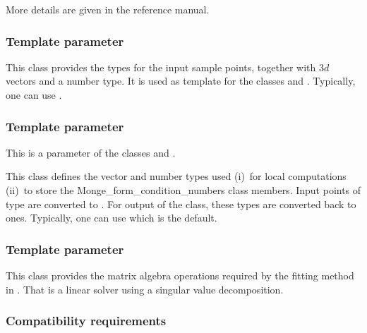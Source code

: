 More details are given in the reference manual.

\subsubsection{Template parameter }

This class provides the types for the input sample points, together
with $3d$ vectors and a number type. It is used as template for the
classes
 and 
. Typically, one can use .

\subsubsection{Template parameter }
This is a parameter of the classes 
and .

This class defines the vector and number types used (i)\ for local
computations (ii)\ to store the Monge\_form\_condition\_numbers class
members. Input points of type  are converted
to
. For output of the  class, these
types are converted back to  ones.  Typically, one can use
 which is the default.

\subsubsection{Template parameter }

This class provides the matrix algebra operations required by the
fitting method in 
. That is a linear solver using a singular value decomposition.

\subsubsection{Compatibility requirements}

